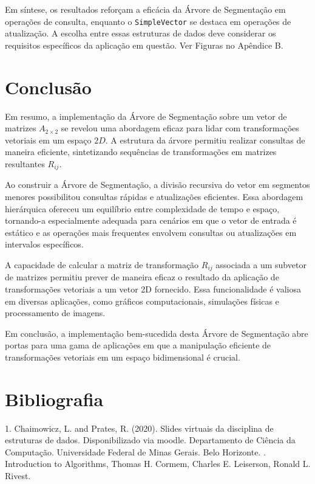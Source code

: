 \documentclass{article}
\begin{document}
Em síntese, os resultados reforçam a eficácia da Árvore de Segmentação em operações de consulta, enquanto o \texttt{SimpleVector} se destaca em operações de atualização. A escolha entre essas estruturas de dados deve considerar os requisitos específicos da aplicação em questão. Ver Figuras no Apêndice B.



\section{Conclusão}

Em resumo, a implementação da Árvore de Segmentação sobre um vetor de matrizes \(A_{2 \times 2}\) se revelou uma abordagem eficaz para lidar com transformações vetoriais em um espaço \(2D\). A estrutura da árvore permitiu realizar consultas de maneira eficiente, sintetizando sequências de transformações em matrizes resultantes \(R_{ij}\).

Ao construir a Árvore de Segmentação, a divisão recursiva do vetor em segmentos menores possibilitou consultas rápidas e atualizações eficientes. Essa abordagem hierárquica ofereceu um equilíbrio entre complexidade de tempo e espaço, tornando-a especialmente adequada para cenários em que o vetor de entrada é estático e as operações mais frequentes envolvem consultas ou atualizações em intervalos específicos.

A capacidade de calcular a matriz de transformação \(R_{ij}\) associada a um subvetor de matrizes permitiu prever de maneira eficaz o resultado da aplicação de transformações vetoriais a um vetor 2D fornecido. Essa funcionalidade é valiosa em diversas aplicações, como gráficos computacionais, simulações físicas e processamento de imagens.

Em conclusão, a implementação bem-sucedida desta Árvore de Segmentação abre portas para uma gama de aplicações em que a manipulação eficiente de transformações vetoriais em um espaço bidimensional é crucial.






\section{Bibliografia}
1. Chaimowicz, L. and Prates, R. (2020). Slides virtuais da disciplina de estruturas de dados. Disponibilizado via moodle. Departamento de Ciência da Computação. Universidade
Federal de Minas Gerais. Belo Horizonte. 
. Introduction to Algorithms, Thomas H. Cormem, Charles E. Leiserson, Ronald L. Rivest.
\end{document}
